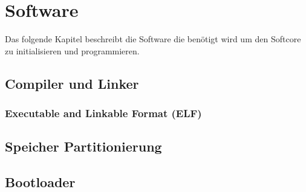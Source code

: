 \chapter{Software}
    Das folgende Kapitel beschreibt die Software die benötigt wird um
    den Softcore zu initialisieren und programmieren.


    \section{Compiler und Linker}

        \subsection{Executable and Linkable Format (ELF)}

    \section{Speicher Partitionierung}

    \section{Bootloader}